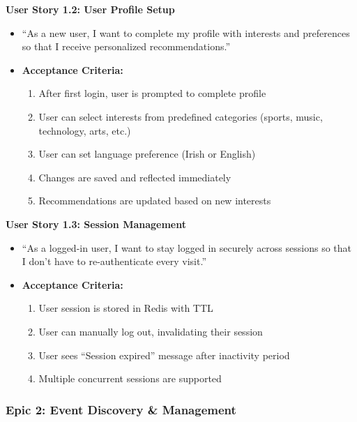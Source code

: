 \documentclass[12pt,a4paper]{article}
\begin{document}
\textbf{User Story 1.2: User Profile Setup}
\begin{itemize}
    \item ``As a new user, I want to complete my profile with interests and preferences so that I receive personalized recommendations.''
    \item \textbf{Acceptance Criteria:}
    \begin{enumerate}
        \item After first login, user is prompted to complete profile
        \item User can select interests from predefined categories (sports, music, technology, arts, etc.)
        \item User can set language preference (Irish or English)
        \item Changes are saved and reflected immediately
        \item Recommendations are updated based on new interests
    \end{enumerate}
\end{itemize}

\textbf{User Story 1.3: Session Management}
\begin{itemize}
    \item ``As a logged-in user, I want to stay logged in securely across sessions so that I don't have to re-authenticate every visit.''
    \item \textbf{Acceptance Criteria:}
    \begin{enumerate}
        \item User session is stored in Redis with TTL
        \item User can manually log out, invalidating their session
        \item User sees ``Session expired'' message after inactivity period
        \item Multiple concurrent sessions are supported
    \end{enumerate}
\end{itemize}

\subsubsection{Epic 2: Event Discovery \& Management}
\end{document}
